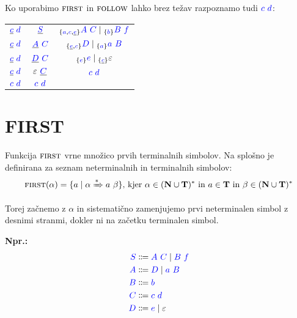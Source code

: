 \documentclass{article}
\newcommand{\Ex}{\textbf{Npr.:}\ }
\newcommand{\FIRST}{\textsc{first}}
\newcommand{\FOLLOW}{\textsc{follow}}
\newcommand{\Set}[1]{\mathbf{#1}}
\newcommand{\Symbol}[1]{\textcolor{blue}{#1}}
\newcommand{\Terminals}{\Set{T}}
\newcommand{\NonTerminals}{\Set{N}}
\newcommand{\Null}{\varepsilon}
\newcommand{\Arrow}{\Coloneq}
\newcommand{\DeriveStar}{\xRightarrow{\ast}}
\newcommand{\Seq}{\ }
\newcommand{\Union}{\mathrel{|}}
\newcommand{\Kleene}[1]{#1^\ast}
\newcommand{\Lookahead}[1]{{}_{\{{#1}\}}}
\begin{document}
Ko uporabimo $\FIRST$ in $\FOLLOW$ lahko brez težav razpoznamo tudi $\Symbol{c} \Seq \Symbol{d}$:
\begin{center}
\begin{tabular}{|c|c|c|}
  \hline
  $\underline{\Symbol{c}} \Seq \Symbol{d}$ & $\underline{\Symbol{S}}$ & $\Lookahead{\Symbol{a}, \Symbol{c}, \underline{\Symbol{e}}} \Symbol{A} \Seq \Symbol{C} \Union \Lookahead{\Symbol{b}} \Symbol{B} \Seq \Symbol{f}$ \\ 
  $\underline{\Symbol{c}} \Seq \Symbol{d}$ & $\underline{\Symbol{A}} \Seq \Symbol{C}$ & $\Lookahead{\underline{\Symbol{e}}, \Symbol{c}} \Symbol{D} \Union \Lookahead{\Symbol{a}} \Symbol{a} \Seq \Symbol{B}$ \\ 
  $\underline{\Symbol{c}} \Seq \Symbol{d}$ & $\underline{\Symbol{D}} \Seq \Symbol{C}$ & $\Lookahead{\Symbol{e}} \Symbol{e} \Union \Lookahead{\underline{\Symbol{c}}} \Null$ \\ 
  $\underline{\Symbol{c}} \Seq \Symbol{d}$ & $\Null \Seq \underline{\Symbol{C}}$ & $\Symbol{c} \Seq \Symbol{d}$ \\ 
  \hline
  $\Symbol{c} \Seq \Symbol{d}$ & $\Symbol{c} \Seq \Symbol{d}$ & \\ 
  \hline
\end{tabular}
\end{center}

\section{FIRST}

Funkcija $\FIRST$ vrne množico prvih terminalnih simbolov.
Na splošno je definirana za seznam neterminalnih in terminalnih simbolov:
\begin{equation*}
  \FIRST(\alpha) = \{ a \mid \alpha \DeriveStar a \Seq \beta \} \text{, kjer } \alpha \in \Kleene{(\NonTerminals \cup \Terminals)} \text{ in } a \in \Terminals \text{ in } \beta \in \Kleene{(\NonTerminals \cup \Terminals)}
\end{equation*}

Torej začnemo z $\alpha$ in sistematično zamenjujemo prvi neterminalen simbol z desnimi stranmi, dokler ni na začetku terminalen simbol.

\Ex
\begin{equation*}
  \begin{aligned}
    \Symbol{S} &\Arrow \Symbol{A} \Seq \Symbol{C} \Union \Symbol{B} \Seq \Symbol{f} \\
    \Symbol{A} &\Arrow \Symbol{D} \Union \Symbol{a} \Seq \Symbol{B} \\
    \Symbol{B} &\Arrow \Symbol{b}\\
    \Symbol{C} &\Arrow \Symbol{c} \Seq \Symbol{d}\\
    \Symbol{D} &\Arrow \Symbol{e} \Union \Null
  \end{aligned}
\end{equation*}
\end{document}
